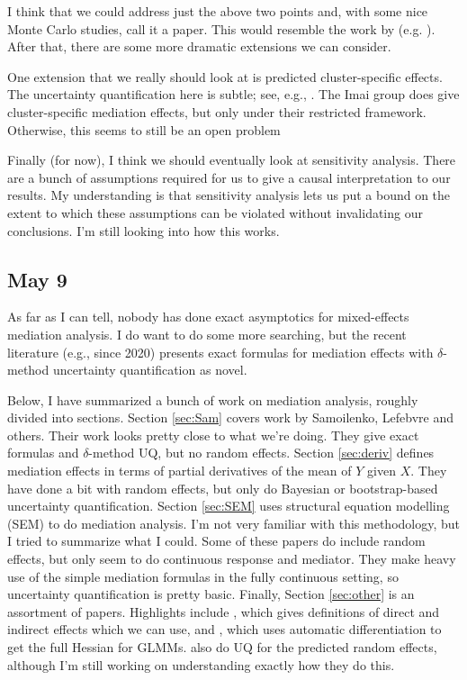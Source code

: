 \documentclass{report}
\begin{document}
I think that we could address just the above two points and, with some nice Monte Carlo studies, call it a paper. This would resemble the work by \citeauthor{Sam23} (e.g. \citealp{Sam23}). After that, there are some more dramatic extensions we can consider.

One extension that we really should look at is predicted cluster-specific effects. The uncertainty quantification here is subtle; see, e.g., \citet{Skr09,Boo98}. The Imai group does give cluster-specific mediation effects, but only under their restricted framework. Otherwise, this seems to still be an open problem

Finally (for now), I think we should eventually look at sensitivity analysis. There are a bunch of assumptions required for us to give a causal interpretation to our results. My understanding is that sensitivity analysis lets us put a bound on the extent to which these assumptions can be violated without invalidating our conclusions. I'm still looking into how this works.


\subsection{May 9}

As far as I can tell, nobody has done exact asymptotics for mixed-effects mediation analysis. I do want to do some more searching, but the recent literature (e.g., since 2020) presents exact formulas for mediation effects with $\delta$-method uncertainty quantification as novel. 

Below, I have summarized a bunch of work on mediation analysis, roughly divided into sections. Section \ref{sec:Sam} covers work by Samoilenko, Lefebvre and others. Their work looks pretty close to what we're doing. They give exact formulas and $\delta$-method UQ, but no random effects. Section \ref{sec:deriv} defines mediation effects in terms of partial derivatives of the mean of $Y$ given $X$. They have done a bit with random effects, but only do Bayesian or bootstrap-based uncertainty quantification. Section \ref{sec:SEM} uses structural equation modelling (SEM) to do mediation analysis. I'm not very familiar with this methodology, but I tried to summarize what I could. Some of these papers do include random effects, but only seem to do continuous response and mediator. They make heavy use of the simple mediation formulas in the fully continuous setting, so uncertainty quantification is pretty basic. Finally, Section \ref{sec:other} is an assortment of papers. Highlights include \citet{Che21}, which gives definitions of direct and indirect effects which we can use, and \citet{Zhe21}, which uses automatic differentiation to get the full Hessian for GLMMs. \citeauthor{Zhe21} also do UQ for the predicted random effects, although I'm still working on understanding exactly how they do this.
\end{document}
